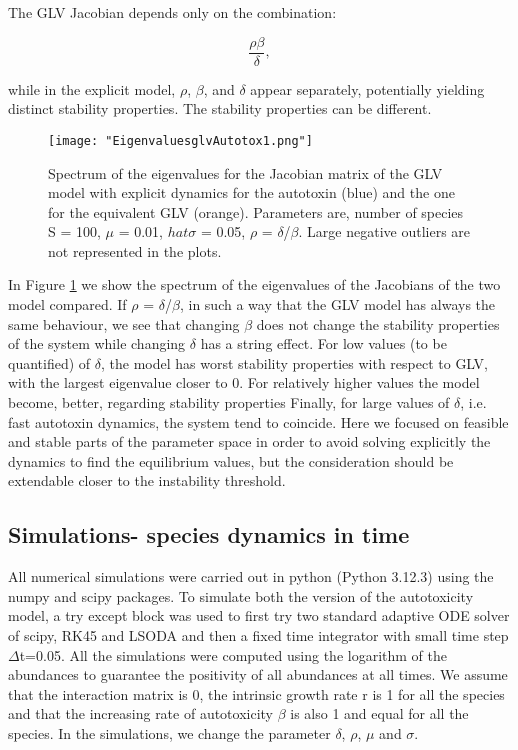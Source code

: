 \documentclass[11pt,a4paper,fleqn]{article}
\begin{document}
The GLV Jacobian depends only on the combination:

\begin{equation}
\frac{\rho \beta}{\delta},
\end{equation}

while in the explicit model, $\rho$, $\beta$, and $\delta$ appear separately, potentially yielding distinct stability properties.
The stability properties can be
different.
\clearpage

\begin{figure}[h]
    \centering
    \texttt{[image: "EigenvaluesglvAutotox1.png"]} 
    \caption{\label{fig:EigenvaluesglvAutotox1} Spectrum of the eigenvalues for the Jacobian matrix of the GLV model with explicit
dynamics for the autotoxin (blue) and the one for the equivalent GLV (orange). Parameters are,
number of species S = 100, $\mu$ = 0.01, $hat{\sigma}$ = 0.05, $\rho$ = $\delta$/$\beta$. Large negative outliers are not represented
in the plots.}
\end{figure}

 In Figure \ref{fig:EigenvaluesglvAutotox1} we show the spectrum of the eigenvalues of the Jacobians of the two model
compared. If $\rho$ = $\delta$/$\beta$, in such a way that the GLV model has always the same behaviour, we see
that changing $\beta$ does not change the stability properties of the system while changing $\delta$ has a
string effect. For low values (to be quantified) of  $\delta$, the model has worst stability properties with
respect to GLV, with the largest eigenvalue closer to 0. For relatively higher values the model
become, better, regarding stability properties Finally, for large values of $\delta$, i.e. fast autotoxin
dynamics, the system tend to coincide.
Here we focused on feasible and stable parts of the parameter space in order to avoid solving
explicitly the dynamics to find the equilibrium values, but the consideration should be extendable
closer to the instability threshold.


\clearpage

\subsection{Simulations- species dynamics in time}

All numerical simulations were carried out in python (Python 3.12.3) using the numpy and scipy packages. 
To simulate both the version of the autotoxicity model, a try except block was used to first try two standard adaptive ODE solver of scipy, RK45 and LSODA 
and then a fixed time integrator with small time step $\Delta$t=0.05. 
All the simulations were computed using the logarithm of the abundances to guarantee the positivity of all abundances at all times.
We assume that the interaction matrix is 0, the intrinsic growth rate r is 1 for all the species and that the increasing rate of autotoxicity $\beta$ is also 1 and equal for all the species.
In the simulations, we change the parameter $\delta$, $\rho$, $\mu$ and $\sigma$.
\end{document}
